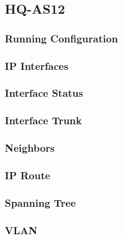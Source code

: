 \subsection{HQ-AS12}
\subsubsection{Running Configuration}


\subsubsection{IP Interfaces}


\subsubsection{Interface Status}


\subsubsection{Interface Trunk}


\subsubsection{Neighbors}


\subsubsection{IP Route}


\subsubsection{Spanning Tree}


\subsubsection{VLAN}
